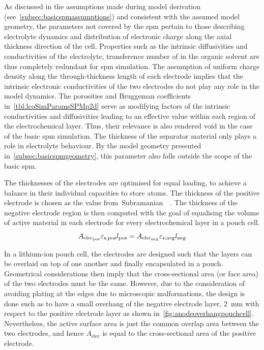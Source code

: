 As    discussed   in    the   assumptions    made   during    model   derivation
(see~\cref{subsec:basicspmassumptions})  and consistent  with the  assumed model
geometry,  the  parameters  not  covered  by  the  \gls{spm}  pertain  to  those
describing electrolyte dynamics and distribution  of electronic charge along the
axial  thickness  direction  of  the  cell. Properties  such  as  the  intrinsic
diffusivities  and conductivities  of  the electrolyte,  transference number  of
 in  the organic  solvent are thus  completely redundant  for \gls{spm}
simulation. The assumption of uniform charge density along the through-thickness
length of each electrode implies that the intrinsic electronic conductivities of
the two electrodes  do not play any  role in the model  dynamics. The porosities
and Bruggeman  coefficients in~\cref{tbl:lcoSimParamsSPMp2d} serve  as modifying
factors  of  the  intrinsic  conductivities  and  diffusivities  leading  to  an
effective value  within each  region of the  electrochemical layer.  Thus, their
relevance is also  rendered void in the case of  the basic \gls{spm} simulation.
The  thickness of  the  separator  material only  plays  a  role in  electrolyte
behaviour.  By the  model geometry  presented in~\cref{subsec:basicspmgeometry},
this parameter also falls outside the scope of the basic \gls{spm}.

The  thicknesses  of the  electrodes  are  optimised  for equal  loading,  \ie{}
to  achieve  a   balance  in  their  individual  capacities   to  store  
atoms.  The  thickness  of  the  positive  electrode  is  chosen  as  the  value
from~Subramanian~\etal{}~\cite{Subramanian2009}. The  thickness of  the negative
electrode region  is then  computed with  the goal of  equalising the  volume of
active material  in each electrode  for every  electrochemical layer in  a pouch
cell.
\begin{equation}\label{eq:basiccapacitybalance}
    A_{\text{elec}_\text{pos}}\varepsilon_{\text{s,pos}} l_\text{pos} = A_{\text{elec}_\text{neg}}\varepsilon_{\text{s,neg}} l_\text{neg}
\end{equation}

In a  lithium-ion pouch cell, the  electrodes are designed such  that the layers
can be  overlaid on  top of  one another  and finally  encapsulated in  a pouch.
Geometrical considerations  then imply  that the  cross-sectional area  (or face
area) of the two electrodes must be  the same. However, due to the consideration
of  avoiding  plating  at  the  edges  due  to  microscopic  malformations,  the
design  is done  such as  to have  a small  overhang of  the negative  electrode
layer,  \approx\SI{2}{\milli\meter}  with  respect  to  the  positive  electrode
layer  as  shown  in~\cref{fig:anodeoverhangpouchcell}.
Nevertheless, the  active surface area is  just the common overlap  area between
the two  electrodes, and hence  $A_\text{elec}$ is equal to  the cross-sectional
area of the positive electrode.

